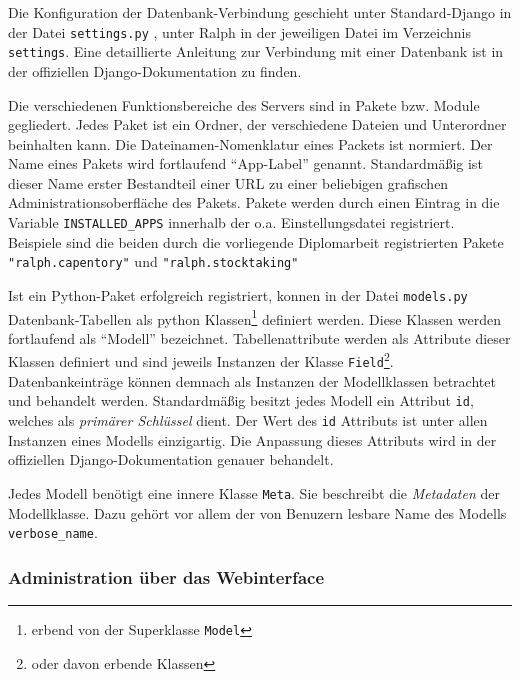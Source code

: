 Die Konfiguration der Datenbank-Verbindung geschieht unter
Standard-Django in der Datei \texttt{settings.py} , unter Ralph in der
jeweiligen Datei im Verzeichnis \texttt{settings}. Eine detaillierte
Anleitung zur Verbindung mit einer Datenbank ist in der offiziellen
Django-Dokumentation \cite{django-doku-db} zu finden.

Die verschiedenen Funktionsbereiche des Servers sind in Pakete bzw.
Module gegliedert. Jedes Paket ist ein Ordner, der verschiedene Dateien
und Unterordner beinhalten kann. Die Dateinamen-Nomenklatur eines
Packets ist normiert.\cite{django-file-nomenklatur} Der Name eines
Pakets wird fortlaufend ``App-Label'' genannt. Standardmäßig ist dieser
Name erster Bestandteil einer URL zu einer beliebigen grafischen
Administrationsoberfläche des Pakets. Pakete werden durch einen Eintrag
in die Variable \texttt{INSTALLED\_APPS} innerhalb der o.a.
Einstellungsdatei registriert. Beispiele sind die beiden durch die
vorliegende Diplomarbeit registrierten Pakete \texttt{"ralph.capentory"}
und \texttt{"ralph.stocktaking"}

Ist ein Python-Paket erfolgreich registriert, konnen in der Datei
\texttt{models.py} Datenbank-Tabellen als python Klassen\footnote{erbend
  von der Superklasse \texttt{Model}\cite{django-doku-models}} definiert
werden. Diese Klassen werden fortlaufend als ``Modell'' bezeichnet.
Tabellenattribute werden als Attribute dieser Klassen definiert und sind
jeweils Instanzen der Klasse
\texttt{Field}\cite{django-doku-models}\footnote{oder davon erbende
  Klassen}. Datenbankeinträge können demnach als Instanzen der
Modellklassen betrachtet und behandelt werden. Standardmäßig besitzt
jedes Modell ein Attribut \texttt{id}, welches als
\emph{primärer Schlüssel}
dient. Der Wert des \texttt{id} Attributs ist unter allen Instanzen
eines Modells einzigartig. Die Anpassung dieses Attributs wird in der
offiziellen Django-Dokumentation genauer behandelt.
\cite{django-doku-models}

Jedes Modell benötigt eine innere Klasse \texttt{Meta}. Sie beschreibt
die
\emph{Metadaten}
der Modellklasse. Dazu gehört vor allem der von Benuzern lesbare Name
des Modells \texttt{verbose\_name}. \cite{django-doku-models-options}

\hypertarget{administration-uxfcber-das-webinterface}{%
\subsubsection{Administration über das
Webinterface}\label{administration-uxfcber-das-webinterface}}

